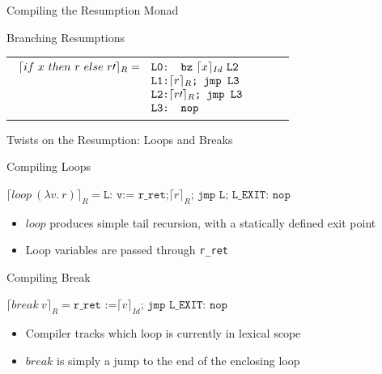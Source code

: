\documentclass{beamer}
\begin{document}
\begin{frame}{Compiling the Resumption Monad}
\begin{structure}{Branching Resumptions}
\begin{onlinebox}{9cm}
\begin{tabular}[t]{llll}
$
\begin{array}[t]{llll}

\lceil if\ x\ then\ r\ else\ r\prime\rceil_R =& \texttt{L0: bz}\ \lceil x \rceil_{Id}\ \texttt{L2}\\
&\texttt{L1:} \lceil r \rceil_R\texttt{; jmp L3}\\
&\texttt{L2:} \lceil r\prime \rceil_R\texttt{; jmp L3}\\
&\texttt{L3: nop}\\

\end{array}
$
\end{tabular}

\end{onlinebox}

\end{structure}

\end{frame}


\begin{frame}{Twists on the Resumption: Loops and Breaks}

\begin{structure}{Compiling Loops}

\begin{onlinebox}{11cm}
$
\lceil loop\ (\lambda v.\ r) \rceil_R = \texttt{L: v:= r\_ret;} \lceil r \rceil_R\texttt{; jmp L; L\_EXIT: nop}
$
\end{onlinebox}

\end{structure}

\begin{itemize}

\item{$loop$ produces simple tail recursion, with a statically defined exit point}

\item{Loop variables are passed through \texttt{r\_ret}}

\end{itemize}

\begin{structure}{Compiling Break}

\begin{onlinebox}{10cm}

$
\lceil break\ v \rceil_R = \texttt{r\_ret :=} \lceil v \rceil_{Id} \texttt{; jmp L\_EXIT: nop}
$

\end{onlinebox}
\end{structure}

\begin{itemize}

\item{Compiler tracks which loop is currently in lexical scope}
\item{$break$ is simply a jump to the end of the enclosing loop}

\end{itemize}


\end{frame}
\end{document}
